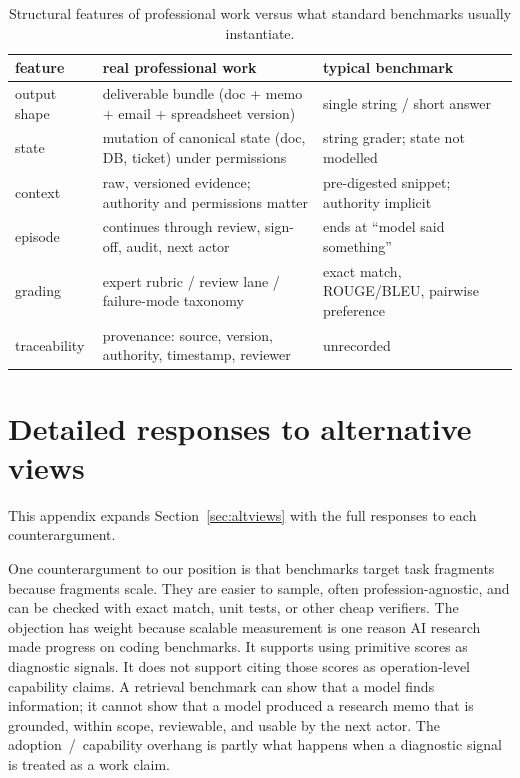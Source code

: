 \documentclass{article}
\begin{document}
\begin{table}[t]
\caption{Structural features of professional work versus what
  standard benchmarks usually instantiate.}
\label{tab:features}
\centering
\footnotesize
\begin{tabularx}{\linewidth}{lXX}
\toprule
feature & real professional work & typical benchmark \\
\midrule
output shape  & deliverable bundle (doc + memo + email + spreadsheet version) & single string / short answer \\
state         & mutation of canonical state (doc, DB, ticket) under permissions & string grader; state not modelled \\
context       & raw, versioned evidence; authority and permissions matter & pre-digested snippet; authority implicit \\
episode       & continues through review, sign-off, audit, next actor & ends at ``model said something'' \\
grading       & expert rubric / review lane / failure-mode taxonomy & exact match, ROUGE/BLEU, pairwise preference \\
traceability  & provenance: source, version, authority, timestamp, reviewer & unrecorded \\
\bottomrule
\end{tabularx}
\end{table}

\section{Detailed responses to alternative views}
\label{app:altviews}

This appendix expands Section~\ref{sec:altviews} with the full responses to each counterargument.

One counterargument to our position is that benchmarks target task fragments because fragments scale.
They are easier to sample, often profession-agnostic, and can be checked with exact match, unit tests, or other cheap verifiers.
The objection has weight because scalable measurement is one reason AI research made progress on coding benchmarks.
It supports using primitive scores as diagnostic signals.
It does not support citing those scores as operation-level capability claims.
A retrieval benchmark can show that a model finds information; it cannot show that a model produced a research memo that is grounded, within scope, reviewable, and usable by the next actor.
The adoption~/~capability overhang \citep{a16z2026adoption,brynjolfsson2026playbook} is partly what happens when a diagnostic signal is treated as a work claim.
\end{document}
